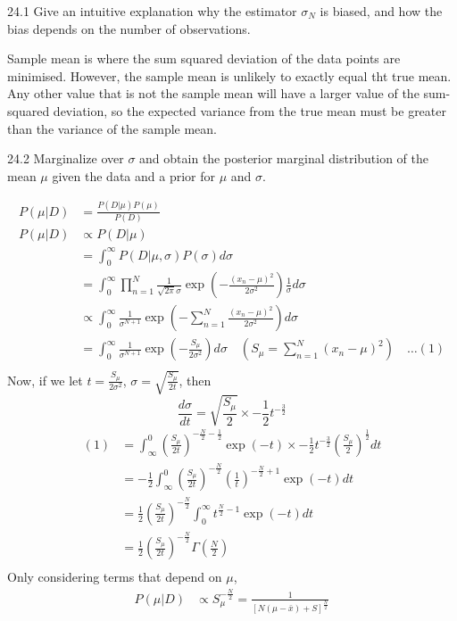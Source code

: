 \documentclass[12pt, a4paper]{article}
\begin{document}
\begin{prob}{24.1}
Give an intuitive explanation why the estimator $\sigma_N$ is biased, and how the bias depends on the number of observations.
\end{prob}
\begin{sol}
Sample mean is where the sum squared deviation of the data points are minimised.
However, the sample mean is unlikely to exactly equal tht true mean.
Any other value that is not the sample mean will have a larger value of the sum-squared deviation,
so the expected variance from the true mean must be greater than the variance of the sample mean.
\end{sol}
\bigskip

\begin{prob}{24.2}
Marginalize over $\sigma$ and obtain the posterior marginal distribution of the mean $\mu$ given the data and a prior for $\mu$ and $\sigma$.
\end{prob}
\begin{sol}
\begin{align*}
P(\mu | D) &= \frac{P(D | \mu)P(\mu)}{P(D)} \\
P(\mu | D) &\propto P(D | \mu) \\
&= \int_{0}^{\infty} P(D | \mu, \sigma)P(\sigma) d\sigma \\
&= \int_{0}^{\infty} \prod_{n=1}^N \frac{1}{\sqrt{2\pi}\sigma}\exp(-\frac{(x_n - \mu)^2}{2\sigma^2}) \frac{1}{\sigma} d\sigma \\
&\propto \int_{0}^{\infty} \frac{1}{\sigma^{N+1}}\exp(-\sum_{n=1}^{N}\frac{(x_n - \mu)^2}{2\sigma^2}) d\sigma \\
&= \int_{0}^{\infty}\frac{1}{\sigma^{N+1}}\exp(-\frac{S_\mu}{2\sigma^2}) d\sigma \quad (S_\mu = \sum_{n=1}^{N} (x_n - \mu)^2) \quad \dots (1) \\
\end{align*}
Now, if we let $t = \frac{S_\mu}{2\sigma^2}$, $\sigma = \sqrt{\frac{S_\mu}{2t}}$, then
$$\frac{d\sigma}{dt} = \sqrt{\frac{S_\mu}{2}} \times -\frac{1}{2}t^{-\frac{3}{2}}$$
\begin{align*}
(1) &= \int_{\infty}^{0} \left(\frac{S_\mu}{2t}\right)^{-\frac{N}{2} - \frac{1}{2}} \exp(-t) \times -\frac{1}{2}t^{-\frac{3}{2}} \left(\frac{S_\mu}{2}\right)^{\frac{1}{2}} dt \\
&= -\frac{1}{2} \int_{\infty}^{0} \left(\frac{S_\mu}{2t}\right)^{-\frac{N}{2}} \left(\frac{1}{t}\right)^{-\frac{N}{2}+1} \exp(-t) dt \\
&= \frac{1}{2}\left(\frac{S_\mu}{2t}\right)^{-\frac{N}{2}} \int_{0}^{\infty} t^{\frac{N}{2} - 1} \exp(-t) dt \\
&= \frac{1}{2} \left(\frac{S_\mu}{2t}\right)^{-\frac{N}{2}} \Gamma(\frac{N}{2}) \\
\end{align*}
Only considering terms that depend on $\mu$, 
\begin{align*}
P(\mu | D) &\propto S_\mu^{-\frac{N}{2}} = \frac{1}{[N(\mu - \bar{x}) + S]^{\frac{N}{2}}} \\
\end{align*}
\end{sol}
\bigskip
\end{document}
